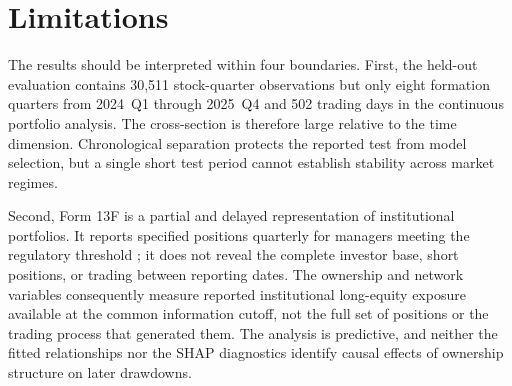 \section{Limitations}
\label{sec:limitations}

The results should be interpreted within four boundaries. First, the held-out evaluation contains 30,511 stock-quarter observations but only eight formation quarters from 2024~Q1 through 2025~Q4 and 502 trading days in the continuous portfolio analysis. The cross-section is therefore large relative to the time dimension. Chronological separation protects the reported test from model selection, but a single short test period cannot establish stability across market regimes.

Second, Form 13F is a partial and delayed representation of institutional portfolios. It reports specified positions quarterly for managers meeting the regulatory threshold \parencite{sec2023form13f}; it does not reveal the complete investor base, short positions, or trading between reporting dates. The ownership and network variables consequently measure reported institutional long-equity exposure available at the common information cutoff, not the full set of positions or the trading process that generated them. The analysis is predictive, and neither the fitted relationships nor the SHAP diagnostics identify causal effects of ownership structure on later drawdowns.

